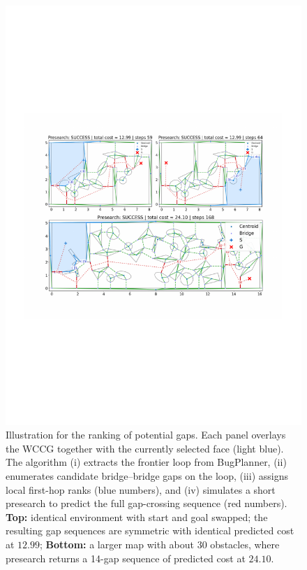 \begin{figure}[t!]
  \centering
  \includegraphics[width=\linewidth]{figures/presearch.pdf}%
  \vspace{-0.15in}
  \caption{
  Illustration for {the ranking of potential gaps.}
  Each panel overlays the WCCG together with the currently selected face (light blue).
  The algorithm (i) extracts the frontier loop from BugPlanner,
  (ii) enumerates candidate bridge--bridge gaps on the loop,
  (iii) assigns local first-hop ranks (blue numbers),
  and (iv) simulates a short presearch to predict the full gap-crossing sequence (red numbers).
  \textbf{Top:} identical environment with start and goal swapped;
  the resulting gap sequences are symmetric with identical predicted cost at $12.99$;
  \textbf{Bottom:} a larger map with about $30$ obstacles, where presearch returns a 14-gap sequence
  of predicted cost at $24.10$.
}

  \label{fig:presearch}
  \vspace{-0.1in}
\end{figure}

